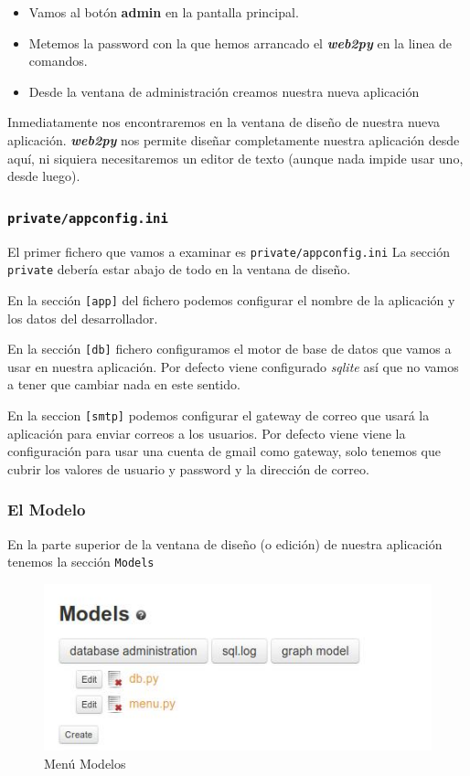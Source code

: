 \documentclass[
  12pt,
  spanish,
]{article}
\providecommand{\tightlist}{%
  \setlength{\itemsep}{0pt}\setlength{\parskip}{0pt}}
\begin{document}
\begin{itemize}
\tightlist
\item
  Vamos al botón \textbf{admin} en la pantalla principal.
\item
  Metemos la password con la que hemos arrancado el
  \textbf{\emph{web2py}} en la linea de comandos.
\item
  Desde la ventana de administración creamos nuestra nueva aplicación
\end{itemize}

Inmediatamente nos encontraremos en la ventana de diseño de nuestra
nueva aplicación. \textbf{\emph{web2py}} nos permite diseñar
completamente nuestra aplicación desde aquí, ni siquiera necesitaremos
un editor de texto (aunque nada impide usar uno, desde luego).

\hypertarget{privateappconfig.ini}{%
\subsubsection{\texorpdfstring{\texttt{private/appconfig.ini}}{private/appconfig.ini}}\label{privateappconfig.ini}}

El primer fichero que vamos a examinar es \texttt{private/appconfig.ini}
La sección \texttt{private} debería estar abajo de todo en la ventana de
diseño.

En la sección \texttt{{[}app{]}} del fichero podemos configurar el
nombre de la aplicación y los datos del desarrollador.

En la sección \texttt{{[}db{]}} fichero configuramos el motor de base de
datos que vamos a usar en nuestra aplicación. Por defecto viene
configurado \emph{sqlite} así que no vamos a tener que cambiar nada en
este sentido.

En la seccion \texttt{{[}smtp{]}} podemos configurar el gateway de
correo que usará la aplicación para enviar correos a los usuarios. Por
defecto viene viene la configuración para usar una cuenta de gmail como
gateway, solo tenemos que cubrir los valores de usuario y password y la
dirección de correo.

\hypertarget{el-modelo}{%
\subsubsection{El Modelo}\label{el-modelo}}

En la parte superior de la ventana de diseño (o edición) de nuestra
aplicación tenemos la sección \texttt{Models}

\begin{figure}
\centering
\includegraphics{src/img/models_menu.jpg}
\caption{Menú Modelos}
\end{figure}
\end{document}
